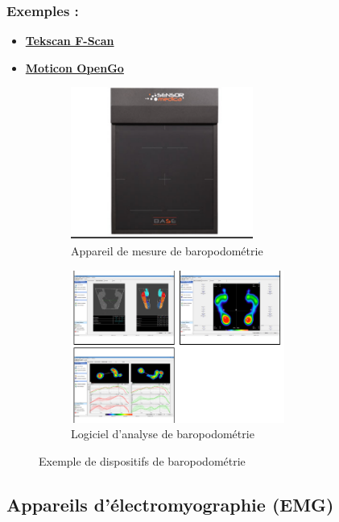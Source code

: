 \subsubsection{Exemples :}
\begin{itemize}
  \item \href{https://www.tekscan.com/products-solutions/systems/f-scan-system}{\textbf{Tekscan F-Scan}}
  \item \href{https://moticon.de/}{\textbf{Moticon OpenGo}}
\end{itemize}

\begin{figure}[ht]
  \centering
  \begin{subfigure}[b]{0.45\textwidth}
    \centering
    \includegraphics[height=5cm]{images/appareil-baropodometrie.png}
    \caption{Appareil de mesure de baropodométrie}\label{fig:appareil_baropodometrie}
  \end{subfigure}
  \begin{subfigure}[b]{0.45\textwidth}
    \centering
    \includegraphics[height=5cm, width=\textwidth]{images/logiciel-analyse-baropodometrie.png}
    \caption{Logiciel d'analyse de baropodométrie}\label{fig:analyse_baropodometrie}
  \end{subfigure}
  \caption{Exemple de dispositifs de baropodométrie}\label{fig:exemple_baropodométrie}
\end{figure}

\subsection{Appareils d’électromyographie (EMG)}


